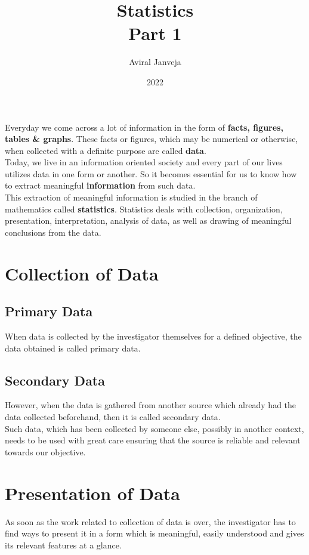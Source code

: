 \documentclass[12pt, letterpaper]{article}
\title{\textbf{\Huge Statistics \\ Part 1}}
\author{Aviral Janveja}
\date{2022}
\begin{document}
\maketitle
  
Everyday we come across a lot of information in the form of \textbf{facts, figures, tables \& graphs}. These facts or figures, which may be numerical or otherwise, when collected with a definite purpose are called \textbf{data}.\\
Today, we live in an information oriented society and every part of our lives utilizes data in one form or another. So it becomes essential for us to know how to extract meaningful \textbf{information} from such data.\\
This extraction of meaningful information is studied in the branch of mathematics called \textbf{statistics}. Statistics deals with collection, organization, presentation, interpretation, analysis of data, as well as drawing of meaningful conclusions from the data.

\section{Collection of Data}
\subsection{Primary Data}
When data is collected by the investigator themselves for a defined objective, the data obtained is called primary data.

\subsection{Secondary Data}
However, when the data is gathered from another source which already had the data collected beforehand, then it is called secondary data.\\
Such data, which has been collected by someone else, possibly in another context, needs to be used with great care ensuring that the source is reliable and relevant towards our objective.


\section{Presentation of Data}
As soon as the work related to collection of data is over, the investigator has to find ways to present it in a form which is meaningful, easily understood and gives its relevant features at a glance. 
\end{document}
